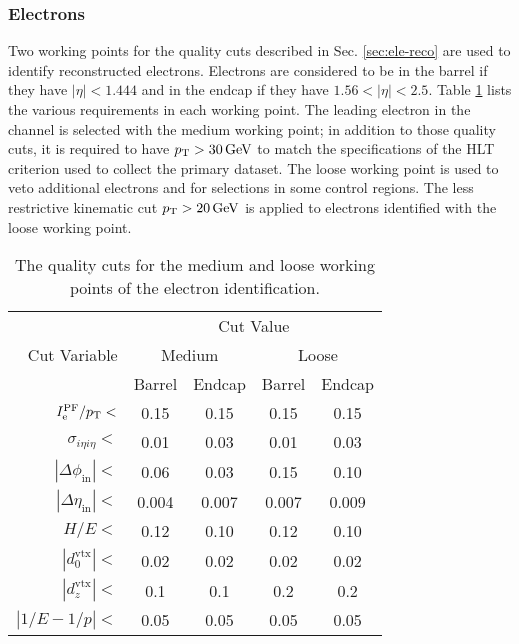 \subsubsection{Electrons
\label{sec:ele-obj}}

Two working points for the quality cuts described in Sec. \ref{sec:ele-reco} are used to identify reconstructed electrons. Electrons are considered to be in the barrel if they have $|\eta|<1.444$ and in the endcap if they have $1.56<|\eta|<2.5$. Table \ref{tab:eleWP} lists the various requirements in each working point. The leading electron in the \etau channel is selected with the medium working point; in addition to those quality cuts, it is required to have $p_{\mathrm{T}}>30\,\text{Ge\hspace{-.08em}V}$ to match the specifications of the HLT criterion used to collect the primary dataset. The loose working point is used to veto additional electrons and for selections in some control regions. The less restrictive kinematic cut $p_{\mathrm{T}}>20\,\text{Ge\hspace{-.08em}V}$ is applied to electrons identified with the loose working point.

\begin{table}[htb]
  \begin{center}
    \begin{tabular}{|r|c|c|c|c|}
      \hline
      \multirow{3}{*}{Cut Variable} & \multicolumn{4}{|c|}{Cut Value} \\
      \cline{2-5}
                                    & \multicolumn{2}{|c|}{Medium} & \multicolumn{2}{|c|}{Loose} \\
      \cline{2-5}
                                    & Barrel & Endcap & Barrel  & Endcap    \\
      \hline
      $I^{\text{PF}}_{\mathrm{e}}/p_{\mathrm{T}}<$    & 0.15     & 0.15     & 0.15      & 0.15      \\      
      $\sigma_{i\eta i\eta}<$       & 0.01     & 0.03     & 0.01      & 0.03    \\ 
      $|\Delta\phi_{\text{in}}|<$   & 0.06     & 0.03     & 0.15      & 0.10    \\ 
      $|\Delta\eta_{\text{in}}|<$   & 0.004    & 0.007    & 0.007     & 0.009    \\ 
      $H/E<$                        & 0.12     & 0.10     & 0.12      & 0.10     \\ 
      $|d_0^{\text{vtx}}|<$         & 0.02     & 0.02     & 0.02      & 0.02     \\              
      $|d_z^{\text{vtx}}|<$         & 0.1      & 0.1      & 0.2       & 0.2      \\              
      $|1/E - 1/p|<$                & 0.05     & 0.05     & 0.05      & 0.05     \\
      \hline
    \end{tabular}
    \caption{The quality cuts for the medium and loose working points of the electron identification. }
    \label{tab:eleWP}
  \end{center}
\end{table}

